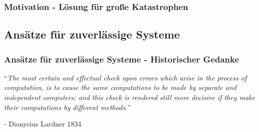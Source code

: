 \begin{frame}
	\frametitle{Motivation - Lösung für große Katastrophen}

	
\end{frame}
%
%
%
\subsection{Ansätze für zuverlässige Systeme}
\begin{frame}
	\frametitle{Ansätze für zuverlässige Systeme - Historischer Gedanke}
	\enquote{\emph{The most certain and effectual check upon errors which arise in the process of computation,	is to cause the same computations to be made by separate and independent computers; and this	check is rendered still more decisive if they make their computations by different methods.}}
	
	- Dionysius Lardner 1834 \cite{lardner}
	
\end{frame}
